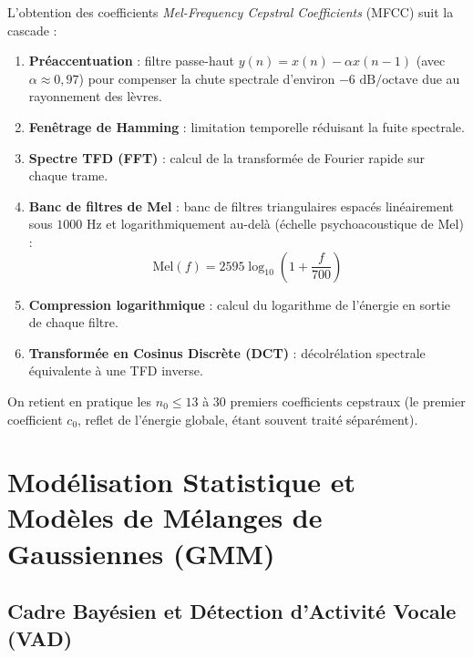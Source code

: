 \begin{definition}
    L'obtention des coefficients \emph{Mel-Frequency Cepstral Coefficients} (MFCC) suit la cascade :
    \begin{enumerate}
        \item \textbf{Préaccentuation} : filtre passe-haut $y(n) = x(n) - \alpha x(n-1)$ (avec $\alpha \approx 0{,}97$) pour compenser la chute spectrale d'environ $-6\text{ dB/octave}$ due au rayonnement des lèvres.
        \item \textbf{Fenêtrage de Hamming} : limitation temporelle réduisant la fuite spectrale.
        \item \textbf{Spectre TFD (FFT)} : calcul de la transformée de Fourier rapide sur chaque trame.
        \item \textbf{Banc de filtres de Mel} : banc de filtres triangulaires espacés linéairement sous $1000\text{ Hz}$ et logarithmiquement au-delà (échelle psychoacoustique de Mel) :
            \begin{equation}
                \text{Mel}(f) = 2595 \log_{10}\left(1 + \frac{f}{700}\right)
            \end{equation}
        \item \textbf{Compression logarithmique} : calcul du logarithme de l'énergie en sortie de chaque filtre.
        \item \textbf{Transformée en Cosinus Discrète (DCT)} : décolrélation spectrale équivalente à une TFD inverse.
    \end{enumerate}
    On retient en pratique les $n_0 \leqslant 13$ à $30$ premiers coefficients cepstraux (le premier coefficient $c_0$, reflet de l'énergie globale, étant souvent traité séparément).
\end{definition}


\section{Modélisation Statistique et Modèles de Mélanges de Gaussiennes (GMM)}

\subsection{Cadre Bayésien et Détection d'Activité Vocale (VAD)}

